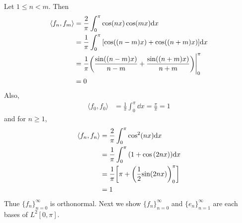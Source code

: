 \documentclass[12pt]{article}
\theoremstyle{plain}
\begin{document}
Let $1 \leq n < m$.  Then
\begin{align*}
    \langle f_n, f_m \rangle &= \frac{2}{\pi}\int_0^\pi \cos(nx)\cos(mx)\dd x \\
    &= \frac{1}{\pi}\int_0^\pi \qty[\cos((n-m)x) + \cos((n+m)x)]\dd x \\
    &= \frac{1}{\pi}\qty(\frac{\sin((n-m)x)}{n-m} + \frac{\sin((n+m)x)}{n+m})\Bigg|_0^\pi \\
    &= 0
\end{align*}
Also,
\begin{align*}
    \langle f_0, f_0 \rangle &= \frac{1}{\pi}\int_0^\pi\dd x = \frac{\pi}{\pi} = 1
\end{align*}
and for $n \geq 1$,
\begin{align*}
    \langle f_n, f_n \rangle &= \frac{2}{\pi}\int_0^\pi \cos^2(nx)\dd x \\
    &= \frac{1}{\pi}\int_0^\pi \qty(1 + \cos\qty(2nx)) \dd x \\
    &= \frac{1}{\pi}\qty[\pi + \qty(\frac{1}{2}{\sin(2nx)})_0^\pi] \\
    &= 1
\end{align*}
Thue $\{f_n\}_{n=0}^\infty$ is orthonormal.  Next we show $\{f_n\}_{n=0}^\infty$ and $\{e_n\}_{n=1}^\infty$ are each bases of $L^2[0, \pi]$.
\end{document}
